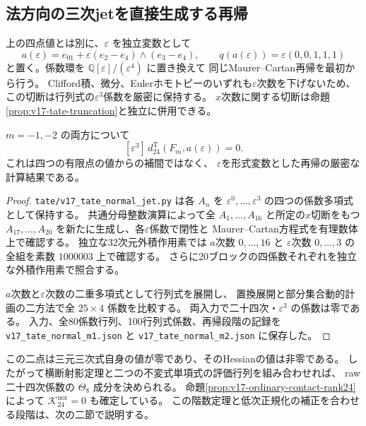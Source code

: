 \subsection{法方向の三次jetを直接生成する再帰}
\label{subsec:v17-tate-normal-jets}
上の四点値とは別に、$\varepsilon$ を独立変数として
\[
 a(\varepsilon)=e_{01}+\varepsilon(e_2-e_4)\wedge(e_3-e_4),
 \qquad q(a(\varepsilon))=\varepsilon(0,0,1,1,1)
\]
と置く。係数環を $\mathbb Q[\varepsilon]/(\varepsilon^4)$ に置き換えて
同じMaurer--Cartan再帰を最初から行う。
Clifford積、微分、Eulerホモトピーのいずれも$\varepsilon$次数を下げないため、
この切断は行列式の$\varepsilon^3$係数を厳密に保持する。
$x$次数に関する切断は命題\ref{prop:v17-tate-truncation}と独立に併用できる。

\begin{proposition}[二十四次の二つの法三次jet]
\label{prop:v17-tate24-normal-jets}
$m=-1,-2$ の両方について
\[
 [\varepsilon^3]\,d_{24}^{\mathrm T}(F_m,a(\varepsilon))=0.
\]
これは四つの有限点の値からの補間ではなく、
$\varepsilon$を形式変数とした再帰の厳密な計算結果である。
\end{proposition}
\begin{proof}
\nolinkurl{tate/v17_tate_normal_jet.py} は各 $A_n$ を
$\varepsilon^0,\ldots,\varepsilon^3$ の四つの係数多項式として保持する。
共通分母整数演算によって全 $A_1,\ldots,A_{16}$ と所定の$x$切断をもつ
$A_{17},\ldots,A_{20}$ を新たに生成し、各$\varepsilon$係数で閉性と
Maurer--Cartan方程式を有理数体上で確認する。
独立な32次元外積作用素では $a$次数 $0,\ldots,16$ と
$\varepsilon$次数 $0,\ldots,3$ の全組を素数 $1000003$ 上で確認する。
さらに20ブロックの四係数それぞれを独立な外積作用素で照合する。

$a$次数と$\varepsilon$次数の二重多項式として行列式を展開し、
置換展開と部分集合動的計画の二方法で全 $25\times4$ 係数を比較する。
両入力で二十四次・$\varepsilon^3$ の係数は零である。
入力、全80係数行列、100行列式係数、再帰段階の記録を
\nolinkurl{v17_tate_normal_m1.json} と
\nolinkurl{v17_tate_normal_m2.json} に保存した。
\end{proof}

この二点は三元三次式自身の値が零であり、そのHessianの値は非零である。
したがって横断射影定理と二つの不変式単項式の評価行列を組み合わせれば、
raw二十四次係数の $\Theta_8$ 成分を決められる。
命題\ref{prop:v17-ordinary-contact-rank24}によって
$\mathcal K_{24}^{\mathrm{nor}}=0$ も確定している。
この階数定理と低次正規化の補正を合わせる段階は、次の二節で説明する。



